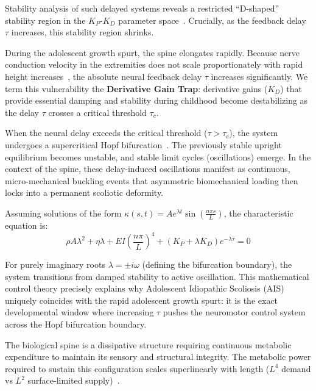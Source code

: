 \documentclass[11pt]{article}
\begin{document}
Stability analysis of such delayed systems reveals a restricted ``D-shaped'' stability region in the $K_P$-$K_D$ parameter space~\cite{peterka2002sensorimotor, masani2006controlling}. Crucially, as the feedback delay $\tau$ increases, this stability region shrinks.

During the adolescent growth spurt, the spine elongates rapidly. Because nerve conduction velocity in the extremities does not scale proportionately with rapid height increases~\cite{lang1985nerve, robinson2001nerve}, the absolute neural feedback delay $\tau$ increases significantly. We term this vulnerability the \textbf{Derivative Gain Trap}: derivative gains ($K_D$) that provide essential damping and stability during childhood become destabilizing as the delay $\tau$ crosses a critical threshold $\tau_c$.



When the neural delay exceeds the critical threshold ($\tau > \tau_c$), the system undergoes a supercritical Hopf bifurcation~\cite{landry2005dynamics}. The previously stable upright equilibrium becomes unstable, and stable limit cycles (oscillations) emerge. In the context of the spine, these delay-induced oscillations manifest as continuous, micro-mechanical buckling events that asymmetric biomechanical loading then locks into a permanent scoliotic deformity.

Assuming solutions of the form $\kappa(s,t) = A e^{\lambda t} \sin\left(\frac{n\pi s}{L}\right)$, the characteristic equation is:
\begin{equation}
\rho A \lambda^2 + \eta \lambda + EI \left(\frac{n\pi}{L}\right)^4 + (K_P + \lambda K_D) e^{-\lambda \tau} = 0
\label{eq:characteristic_dde}
\end{equation}

For purely imaginary roots $\lambda = \pm i\omega$ (defining the bifurcation boundary), the system transitions from damped stability to active oscillation. This mathematical control theory precisely explains why Adolescent Idiopathic Scoliosis (AIS) uniquely coincides with the rapid adolescent growth spurt: it is the exact developmental window where increasing $\tau$ pushes the neuromotor control system across the Hopf bifurcation boundary.



The biological spine is a dissipative structure requiring continuous metabolic expenditure to maintain its sensory and structural integrity. The metabolic power required to sustain this configuration scales superlinearly with length ($L^4$ demand vs $L^2$ surface-limited supply)~\cite{sato2025convective}.
\end{document}
